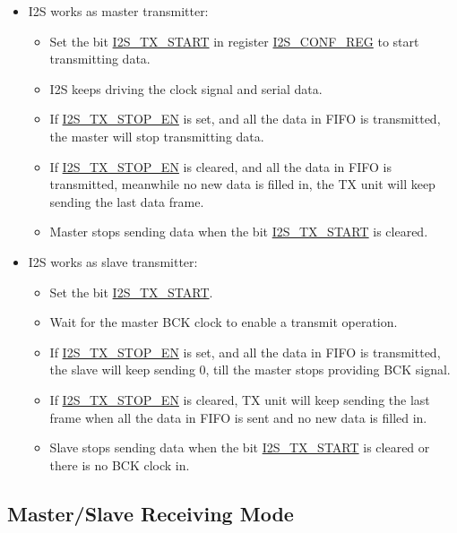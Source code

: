 \documentclass[main\_\_EN.tex]{subfiles}
\begin{document}
\begin{itemize}
    \item I2S works as master transmitter:
        \begin{itemize}
            \item Set the bit \hyperref[fielddesc:I2STXSTART]{I2S\_TX\_START} in register \hyperref[regdesc:I2SCONFREG]{I2S\_CONF\_REG} to start transmitting data.
            \item I2S keeps driving the clock signal and serial data.
            \item If \hyperref[fielddesc:I2STXSTOPEN]{I2S\_TX\_STOP\_EN} is set, and all the data in FIFO is transmitted, the master will stop transmitting data.
            \item If \hyperref[fielddesc:I2STXSTOPEN]{I2S\_TX\_STOP\_EN} is cleared, and all the data in FIFO is transmitted, meanwhile no new data is filled in, the TX unit will keep sending the last data frame.
            \item Master stops sending data when the bit \hyperref[fielddesc:I2STXSTART]{I2S\_TX\_START} is cleared.
        \end{itemize}
    \item I2S works as slave transmitter:
        \begin{itemize}
            \item Set the bit \hyperref[fielddesc:I2STXSTART]{I2S\_TX\_START}.
            \item Wait for the master BCK clock to enable a transmit operation.
            \item If \hyperref[fielddesc:I2STXSTOPEN]{I2S\_TX\_STOP\_EN} is set, and all the data in FIFO is transmitted, the slave will keep sending 0, till the master stops providing BCK signal.
            \item If \hyperref[fielddesc:I2STXSTOPEN]{I2S\_TX\_STOP\_EN} is cleared, TX unit will keep sending the last frame when all the data in FIFO is sent and no new data is filled in.
            \item Slave stops sending data when the bit \hyperref[fielddesc:I2STXSTART]{I2S\_TX\_START} is cleared or there is no BCK clock in.

        \end{itemize}
\end{itemize}

\subsection{Master/Slave Receiving Mode}
\end{document}
